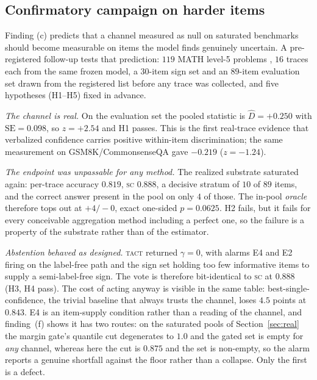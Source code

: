\documentclass[twoside,11pt]{article}
\newcommand{\Dhat}{\widehat{D}}
\newcommand{\SC}{\textsc{sc}}
\newcommand{\TACT}{\textsc{tact}}
\begin{document}
\subsection{Confirmatory campaign on harder items}\label{sec:hard}
Finding (c) predicts that a channel measured as null on saturated benchmarks
should become measurable on items the model finds genuinely uncertain. A
pre-registered follow-up tests that prediction: $119$ MATH level-5 problems
\citep{math500,lightman2024verify}, $16$ traces each from the same frozen
model, a $30$-item sign set and an $89$-item evaluation set drawn from the
registered list before any trace was collected, and five hypotheses (H1--H5)
fixed in advance.

\emph{The channel is real.} On the evaluation set the pooled statistic is
$\Dhat=+0.250$ with $\mathrm{SE}=0.098$, so $z=+2.54$ and H1 passes. This is
the first real-trace evidence that verbalized confidence carries positive
within-item discrimination; the same measurement on GSM8K/CommonsenseQA gave
$-0.219$ ($z=-1.24$).

\emph{The endpoint was unpassable for any method.} The realized substrate
saturated again: per-trace accuracy $0.819$, \SC{} $0.888$, a decisive
stratum of $10$ of $89$ items, and the correct answer present in the pool on
only $4$ of those. The in-pool \emph{oracle} therefore tops out at $+4/-0$,
exact one-sided $p=0.0625$. H2 fails, but it fails for every conceivable
aggregation method including a perfect one, so the failure is a property of
the substrate rather than of the estimator.

\emph{Abstention behaved as designed.} \TACT{} returned $\gamma=0$, with
alarms E4 and E2 firing on the label-free path and the sign set holding too
few informative items to supply a semi-label-free sign. The vote is therefore
bit-identical to \SC{} at $0.888$ (H3, H4 pass). The cost of acting anyway is
visible in the same table: best-single-confidence, the trivial baseline that
always trusts the channel, loses $4.5$ points at $0.843$. E4 is an
item-supply condition rather than a reading of the channel, and finding~(f)
shows it has two routes: on the saturated pools of Section~\ref{sec:real} the
margin gate's quantile cut degenerates to $1.0$ and the gated set is empty for
\emph{any} channel, whereas here the cut is $0.875$ and the set is non-empty,
so the alarm reports a genuine shortfall against the floor rather than a
collapse. Only the first is a defect.
\end{document}
